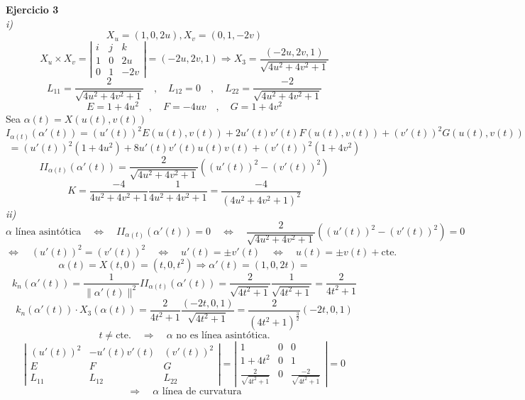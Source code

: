 \documentclass{article}
\begin{document}
\textbf{Ejercicio 3}\\
\textit{i)}\\
$$
X_u = (1,0,2u), X_v=(0,1,-2v)
$$
$$
X_u \times X_v = \left|\begin{array}{ccc}
    i & j & k \\
    1 & 0 & 2u \\
    0 & 1 & -2v    
\end{array}\right| = (-2u,2v,1) \Rightarrow X_3 = \frac{(-2u,2v,1)}{\sqrt{4u^2+4v^2+1}}
$$
$$
L_{11}=\frac{2}{\sqrt{4u^2+4v^2+1}} \quad , \quad L_{12}=0 \quad , \quad L_{22}=\frac{-2}{\sqrt{4u^2+4v^2+1}} 
$$
$$
E=1+4u^2 \quad , \quad F=-4uv \quad , \quad G=1+4v^2
$$
Sea $\alpha(t)=X(u(t),v(t))$
$$
I_{\alpha(t)}(\alpha'(t)) = (u'(t))^2E(u(t),v(t))+2u'(t)v'(t)F(u(t),v(t))+(v'(t))^2 G(u(t),v(t))
$$
$$
= (u'(t))^2(1+4u^2)+8u'(t)v'(t)u(t)v(t)+(v'(t))^2 (1+4v^2)
$$
$$
II_{\alpha(t)}(\alpha'(t))= \frac{2}{\sqrt{4u^2+4v^2+1}} ((u'(t))^2-(v'(t))^2)
$$
$$
K = \frac{-4}{4u^2+4v^2+1} \frac{1}{4u^2+4v^2+1} = \frac{-4}{(4u^2+4v^2+1)^2}
$$
\textit{ii)}\\
$$
\text{$\alpha$ línea asintótica} \quad \Leftrightarrow \quad II_{\alpha(t)}(\alpha'(t))=0 \quad \Leftrightarrow \quad \frac{2}{\sqrt{4u^2+4v^2+1}} ((u'(t))^2-(v'(t))^2) = 0
$$
$$
\Leftrightarrow \quad (u'(t))^2 = (v'(t))^2 \quad \Leftrightarrow \quad u'(t)=\pm v'(t) \quad \Leftrightarrow \quad u(t)=\pm v(t) + \text{cte.}
$$
$$
\alpha(t)= X(t,0) = (t,0,t^2) \Rightarrow \alpha'(t)= (1,0,2t)=
$$
$$
k_n(\alpha'(t))= \frac{1}{\| \alpha'(t)\|^2} II_{\alpha(t)}(\alpha'(t))= \frac{2}{\sqrt{4t^2+1}} \frac{1}{\sqrt{4t^2+1}} = \frac{2}{4t^2+1}
$$
$$
k_n(\alpha'(t))\cdot X_3(\alpha(t)) = \frac{2}{4t^2+1} \frac{(-2t,0,1)}{\sqrt{4t^2+1}} = \frac{2}{(4t^2+1)^{\frac{3}{2}}}(-2t,0,1)
$$
$$
t\ne\text{cte.} \quad \Rightarrow \quad \text{$\alpha$ no es línea asintótica.}
$$
$$
\left|\begin{array}{ccc}
    (u'(t))^2 & -u'(t)v'(t) & (v'(t))^2 \\
    E & F & G \\
    L_{11} & L_{12} & L_{22}    
\end{array}\right| =
\left|\begin{array}{ccc}
    1 & 0 & 0 \\
    1+4t^2 & 0 & 1 \\
    \frac{2}{\sqrt{4t^2+1}} & 0 & \frac{-2}{\sqrt{4t^2+1}}
\end{array}\right|=0
$$
$$
\Rightarrow \quad \text{$\alpha$ línea de curvatura}
$$
\end{document}
